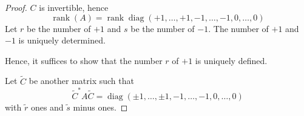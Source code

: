 \documentclass[a4paper]{article}
\numberwithin{lecref}{section}
\DeclareMathOperator{\rank}{rank}
\begin{document}
\begin{proof}
  $C$ is invertible, hence
  \[
    \rank(A) =
    \rank %
    \operatorname{diag}(+1, \dots, +1, -1, \dots, -1, 0, \dots, 0)
  \]
  Let $r$ be the number of $+1$ and $s$ be the number of $-1$.
  The number of $+1$ and $-1$ is uniquely determined.

  Hence, it suffices to show that the number $r$ of $+1$ is uniquely defined.

  Let $\tilde{C}$ be another matrix such that
  \[ \tilde C^* A \tilde C = %
    \operatorname{diag}(\pm 1, \dots, \pm 1, -1, \dots, -1, 0, \dots, 0)
  \]
  with $\tilde r$ ones and $\tilde s$ minus ones.


\end{proof}
\end{document}

